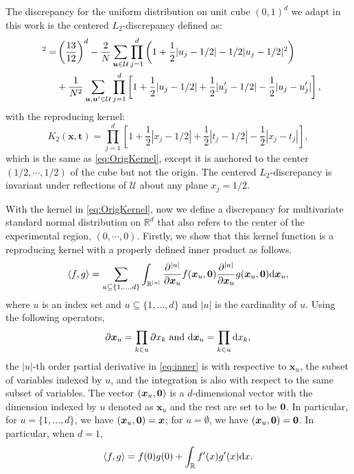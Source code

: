 \documentclass[graybox]{svmult}
\newcommand{\vx}{\boldsymbol{x}}
\newcommand{\vt}{\boldsymbol{t}}
\newcommand{\vu}{\boldsymbol{u}}
\newcommand{\dif}{{\rm d}}
\newcommand{\Udes}{\mathcal{U}}
\newcommand{\unif}{\textup{unif}}
\begin{document}
The discrepancy for the uniform distribution on unit cube $(0,1)^d$ we adapt in this work is the centered $L_2$-discrepancy \cite{Hic97a} defined as:
\begin{align*}
[D_2(\Udes, F_\unif, K_2)]^2 =& \left(\frac{13}{12}\right)^d - \frac{2}{N}\sum\limits_{\vu\in \Udes}\prod_{j=1}^d \left(1+\frac{1}{2}|u_j-1/2|-1/2|u_j-1/2|^2\right)\\
\hspace{5ex}&+ \frac{1}{N^2}\sum\limits_{\vu,\vu'\in \Udes}\prod_{j=1}^d\left[1+\frac{1}{2}|u_j-1/2|+\frac{1}{2}|u_j'-1/2|-\frac{1}{2}|u_j-u_j'|\right],    
\end{align*}
with the reproducing kernel:
\begin{equation}\label{eqn:oril2kernel}
K_2(\vx,\vt) = \prod\limits_{j=1}^d\left[1+\frac{1}{2}|x_j-1/2|+\frac{1}{2}|t_j-1/2|-\frac{1}{2}|x_j-t_j|\right],
\end{equation}
which is the same as \eqref{eq:OrigKernel}, except it is anchored to the center $(1/2,\cdots,1/2)$ of the cube but not the origin. The centered $L_2$-discrepancy is invariant under reflections of $\Udes$ about any plane $x_j = 1/2$. 

With the kernel in \eqref{eq:OrigKernel}, now we define a discrepancy for multivariate standard normal distribution on $\mathbb{R}^d$ that also refers to the center of the experimental region, $(0,\cdots,0)$. Firstly, we show that this kernel function is a reproducing kernel with a properly defined inner product as follows. 
\begin{equation}\label{eq:inner}
\langle f,g \rangle = \sum_{u\subseteq \{1,...,d\}}\int_{\mathbb{R}^{|u|}}\frac{\partial^{|u|}}{\partial \vx_u}f(\vx_u,{\bf 0})\frac{\partial^{|u|}}{\partial \vx_u}g(\vx_u,{\bf 0})\dif \vx_u,
\end{equation}
where $u$ is an index set and $u\subseteq \{1, \ldots, d\}$ and $|u|$ is the cardinality of $u$. 
Using the following operators, 
$$\partial \vx_u = \prod\limits_{k\in u}\partial x_k \text{ and } \dif \vx_u = \prod\limits_{k\in u}\dif x_k , $$
the $|u|$-th order partial derivative in \eqref{eq:inner} is with respective to $\vx_{u}$, the subset of variables indexed by $u$, and the integration is also with respect to the same subset of variables. 
The vector $(\vx_u,{\bf 0})$ is a $d$-dimensional vector with the dimension indexed by $u$ denoted as $\vx_u$ and the rest are set to be ${\bf 0}$. 
In particular, for $u = \{1,...,d\}$, we have $(\vx_u,{\bf 0}) = \vx$; for $u=\emptyset$, we have $(\vx_u,{\bf 0}) = {\bf 0}$. In particular, when $d=1$,
\begin{equation*}
\langle f,g \rangle = f(0)g(0)+\int_{\mathbb{R}}f'(x)g'(x)\dif x.
\end{equation*}
\end{document}
